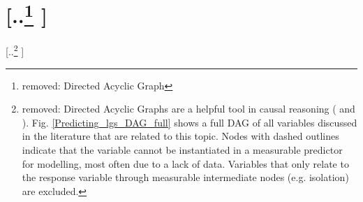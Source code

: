 \documentclass[unnumsec,webpdf,modern,medium]{oup-authoring-template}
\providecommand{\DIFdeltex}[1]{{\protect\color{red} [..\footnote{removed: #1} ]}} %
\providecommand{\DIFdel}[1]{\texorpdfstring{\DIFdeltex{#1}}{}} %
\begin{document}


\section{\DIFdel{Directed Acyclic Graph}}
\addtocounter{section}{-1}%
\DIFdel{Directed Acyclic Graphs are a helpful tool in causal reasoning (\citet{pearl1995causal} and \citet{mcelreath2020statistical}). Fig. \ref{Predicting_lgs_DAG_full} shows a full DAG of all variables discussed in the literature that are related to this topic. Nodes with dashed outlines indicate that the variable cannot be instantiated in a measurable predictor for modelling, most often due to a lack of data. Variables that only relate to the response variable through measurable intermediate nodes (e.g. isolation) are excluded.
 }%


\end{document}
